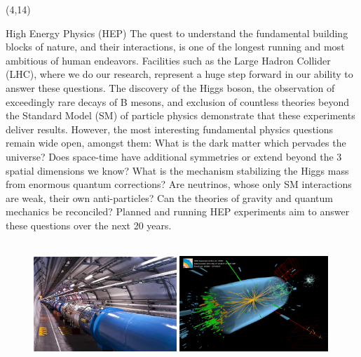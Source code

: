 \documentclass[final]{beamer}
\begin{document}
\begin{frame}{}
\begin{textblock}{38.0}(4,14)
\begin{block}{High Energy Physics (HEP)}
The quest to understand the fundamental building blocks of nature,
and their interactions, is one of the longest running and most
ambitious of human endeavors. Facilities such as the Large Hadron
Collider (LHC), where we do our research, represent a huge step
forward in our ability to answer these questions. The discovery of
the Higgs boson, the observation of exceedingly rare decays of B
mesons, and exclusion of countless theories beyond the Standard
Model (SM) of particle physics demonstrate that these experiments
deliver results. However, the most interesting fundamental physics
questions remain wide open, amongst them: What is the dark matter
which pervades the universe? Does space-time have additional
symmetries or extend beyond the 3 spatial dimensions we know? What
is the mechanism stabilizing the Higgs mass from enormous quantum
corrections? Are neutrinos, whose only SM interactions are weak,
their own anti-particles? Can the theories of gravity and quantum
mechanics be reconciled? Planned and running HEP experiments 
aim to answer these questions over the next 20 years.
~~~ \\
~~~ \\
\begin{figure}[tbph]
\centering
\includegraphics[width=0.48\textwidth]{images/0910152_02-A5-at-72-dpi.jpg}
\includegraphics[width=0.50\textwidth]{images/eemm_run195099_evt137440354_ispy_3d-annotated-2.png}
\end{figure}
\end{block}
\end{textblock}





\end{frame}
\end{document}
